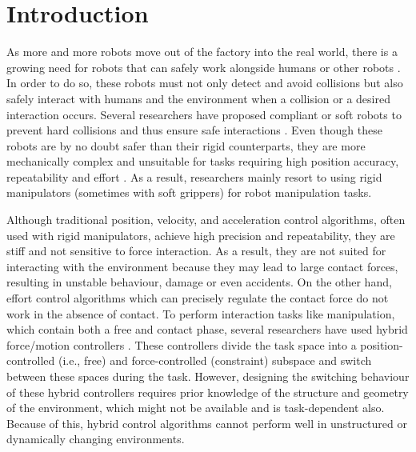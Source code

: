 \chapter{Introduction}
\label{chapter:introduction}

As more and more robots move out of the factory into the real world, there is a growing need for robots that can safely work alongside humans or other robots \cite{sharkawySurveyApplicationsHumanRobot2021,zacharakiSafetyBoundsHuman2020,suomalainenSurveyRobotManipulation2021}. In order to do so, these robots must not only detect and avoid collisions \cite{haddadinRobotCollisionsSurvey2017, zacharakiSafetyBoundsHuman2020} but also safely interact with humans and the environment when a collision or a desired interaction occurs. Several researchers have proposed compliant or soft robots to prevent hard collisions and thus ensure safe interactions \cite{hughesSoftManipulatorsGrippers2016,douSoftRoboticManipulators2021}. Even though these robots are by no doubt safer than their rigid counterparts, they are more mechanically complex and unsuitable for tasks requiring high position accuracy, repeatability and effort \cite{douSoftRoboticManipulators2021}. As a result, researchers mainly resort to using rigid manipulators (sometimes with soft grippers) for robot manipulation tasks.

Although traditional position, velocity, and acceleration control algorithms, often used with rigid manipulators, achieve high precision and repeatability, they are stiff and not sensitive to force interaction. As a result, they are not suited for interacting with the environment because they may lead to large contact forces, resulting in unstable behaviour, damage or even accidents. On the other hand, effort control algorithms which can precisely regulate the contact force do not work in the absence of contact. To perform interaction tasks like manipulation, which contain both a free and contact phase, several researchers have used hybrid force/motion controllers \cite{raibertHybridPositionForce1981,ortenziHybridMotionForce2017}. These controllers divide the task space into a position-controlled (i.e., free) and force-controlled (constraint) subspace and switch between these spaces during the task. However, designing the switching behaviour of these hybrid controllers requires prior knowledge of the structure and geometry of the environment, which might not be available and is task-dependent also. Because of this, hybrid control algorithms cannot perform well in unstructured or dynamically changing environments.

